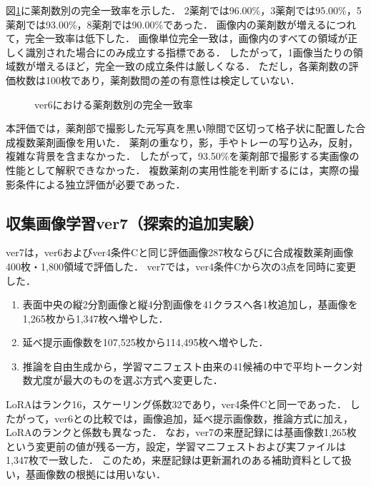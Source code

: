 \documentclass[uplatex,dvipdfmx]{jsarticle}
\begin{document}
図\ref{fig:multi_count}に薬剤数別の完全一致率を示した．
2薬剤では96.00\%，3薬剤では95.00\%，5薬剤では93.00\%，8薬剤では90.00\%であった．
画像内の薬剤数が増えるにつれて，完全一致率は低下した．
画像単位完全一致は，画像内のすべての領域が正しく識別された場合にのみ成立する指標である．
したがって，1画像当たりの領域数が増えるほど，完全一致の成立条件は厳しくなる．
ただし，各薬剤数の評価枚数は100枚であり，薬剤数間の差の有意性は検定していない．

\begin{figure}[htbp]
  \centering
  \caption{ver6における薬剤数別の完全一致率}
  \label{fig:multi_count}
\end{figure}

本評価では，薬剤部で撮影した元写真を黒い隙間で区切って格子状に配置した合成複数薬剤画像を用いた．
薬剤の重なり，影，手やトレーの写り込み，反射，複雑な背景を含まなかった．
したがって，93.50\%を薬剤部で撮影する実画像の性能として解釈できなかった．
複数薬剤の実用性能を判断するには，実際の撮影条件による独立評価が必要であった．

\subsection{収集画像学習ver7（探索的追加実験）}\label{sec:ver7_results}

ver7は，ver6およびver4条件Cと同じ評価画像287枚ならびに合成複数薬剤画像400枚・1,800領域で評価した．
ver7では，ver4条件Cから次の3点を同時に変更した．
\begin{enumerate}
  \item 表面中央の縦2分割画像と縦4分割画像を41クラスへ各1枚追加し，基画像を1,265枚から1,347枚へ増やした．
  \item 延べ提示画像数を107,525枚から114,495枚へ増やした．
  \item 推論を自由生成から，学習マニフェスト由来の41候補の中で平均トークン対数尤度が最大のものを選ぶ方式へ変更した．
\end{enumerate}
LoRAはランク16，スケーリング係数32であり，ver4条件Cと同一であった．
したがって，ver6との比較では，画像追加，延べ提示画像数，推論方式に加え，LoRAのランクと係数も異なった．
なお，ver7の来歴記録には基画像数1,265枚という変更前の値が残る一方，設定，学習マニフェストおよび実ファイルは1,347枚で一致した．
このため，来歴記録は更新漏れのある補助資料として扱い，基画像数の根拠には用いない．
\end{document}
